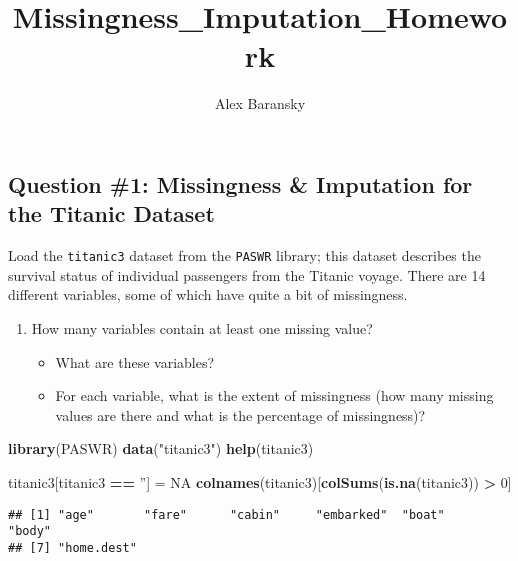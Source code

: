 \documentclass[]{article}
\title{Missingness\_Imputation\_Homework}
\author{Alex Baransky}
\date{}
\newenvironment{Shaded}{\begin{snugshade}}{\end{snugshade}}
\newcommand{\KeywordTok}[1]{\textcolor[rgb]{0.13,0.29,0.53}{\textbf{#1}}}
\newcommand{\DecValTok}[1]{\textcolor[rgb]{0.00,0.00,0.81}{#1}}
\newcommand{\StringTok}[1]{\textcolor[rgb]{0.31,0.60,0.02}{#1}}
\newcommand{\OtherTok}[1]{\textcolor[rgb]{0.56,0.35,0.01}{#1}}
\newcommand{\OperatorTok}[1]{\textcolor[rgb]{0.81,0.36,0.00}{\textbf{#1}}}
\newcommand{\NormalTok}[1]{#1}
\providecommand{\tightlist}{%
  \setlength{\itemsep}{0pt}\setlength{\parskip}{0pt}}
\begin{document}
\maketitle

\subsection{Question \#1: Missingness \& Imputation for the Titanic
Dataset}\label{question-1-missingness-imputation-for-the-titanic-dataset}

Load the \texttt{titanic3} dataset from the \texttt{PASWR} library; this
dataset describes the survival status of individual passengers from the
Titanic voyage. There are 14 different variables, some of which have
quite a bit of missingness.

\begin{enumerate}
\def\labelenumi{\arabic{enumi}.}
\tightlist
\item
  How many variables contain at least one missing value?

  \begin{itemize}
  \tightlist
  \item
    What are these variables?
  \item
    For each variable, what is the extent of missingness (how many
    missing values are there and what is the percentage of missingness)?
  \end{itemize}
\end{enumerate}

\begin{Shaded}
\begin{Highlighting}[]
\KeywordTok{library}\NormalTok{(PASWR)}
\KeywordTok{data}\NormalTok{(}\StringTok{"titanic3"}\NormalTok{)}
\KeywordTok{help}\NormalTok{(titanic3)}

\NormalTok{titanic3[titanic3 }\OperatorTok{==}\StringTok{ ''}\NormalTok{] =}\StringTok{ }\OtherTok{NA}
\KeywordTok{colnames}\NormalTok{(titanic3)[}\KeywordTok{colSums}\NormalTok{(}\KeywordTok{is.na}\NormalTok{(titanic3)) }\OperatorTok{>}\StringTok{ }\DecValTok{0}\NormalTok{]}
\end{Highlighting}
\end{Shaded}

\begin{verbatim}
## [1] "age"       "fare"      "cabin"     "embarked"  "boat"      "body"     
## [7] "home.dest"
\end{verbatim}

\begin{Shaded}
\end{Shaded}
\end{document}
